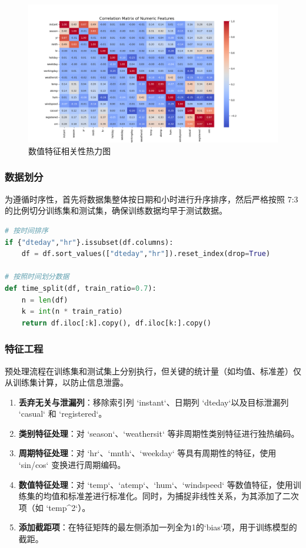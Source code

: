 \documentclass[UTF8,a4paper,10pt]{ctexart}
\begin{document}
\begin{figure}[H]
    \centering
    \includegraphics[width=0.9\linewidth]{pic/correlation_matrix.png}
    \caption{数值特征相关性热力图}
    \label{fig:corr_matrix}
\end{figure}


\subsubsection{数据划分}
为遵循时序性，首先将数据集整体按日期和小时进行升序排序，然后严格按照 7:3 的比例切分训练集和测试集，确保训练数据均早于测试数据。
\begin{lstlisting}[language=Python]
# 按时间排序
if {"dteday","hr"}.issubset(df.columns):
    df = df.sort_values(["dteday","hr"]).reset_index(drop=True)

# 按照时间划分数据
def time_split(df, train_ratio=0.7):
    n = len(df)
    k = int(n * train_ratio)
    return df.iloc[:k].copy(), df.iloc[k:].copy()
\end{lstlisting}

\subsubsection{特征工程}
预处理流程在训练集和测试集上分别执行，但关键的统计量（如均值、标准差）仅从训练集计算，以防止信息泄露。
\begin{enumerate}
    \item \textbf{丢弃无关与泄漏列}：移除索引列 `instant`、日期列 `dteday`以及目标泄漏列 `casual` 和 `registered`。
    \item \textbf{类别特征处理}：对 `season`、`weathersit` 等非周期性类别特征进行独热编码。
    \item \textbf{周期特征处理}：对 `hr`、`mnth`、`weekday` 等具有周期性的特征，使用 `sin/cos` 变换进行周期编码。
    \item \textbf{数值特征处理}：对 `temp`、`atemp`、`hum`、`windspeed` 等数值特征，使用训练集的均值和标准差进行标准化。同时，为捕捉非线性关系，为其添加了二次项（如 `temp^2`）。
    \item \textbf{添加截距项}：在特征矩阵的最左侧添加一列全为1的`bias`项，用于训练模型的截距。
\end{enumerate}
\end{document}
